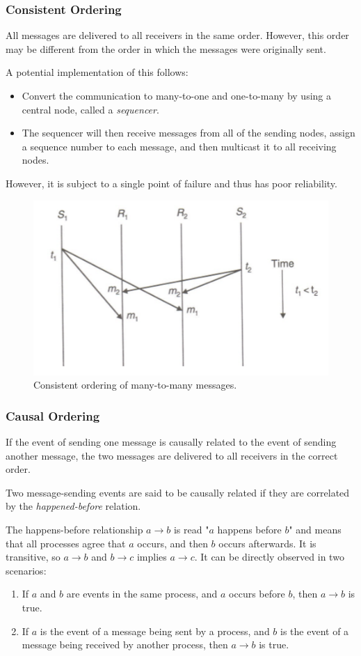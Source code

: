 \subsubsection{Consistent Ordering}
All messages are delivered to all receivers in the same order. However, this order may be different from the order in which the messages were originally sent.

A potential implementation of this follows: \begin{itemize}
\item Convert the communication to many-to-one and one-to-many by using a central node, called a \textit{sequencer}.
\item The sequencer will then receive messages from all of the sending nodes, assign a sequence number to each message, and then multicast it to all receiving nodes.
\end{itemize}

However, it is subject to a single point of failure and thus has poor reliability.

\begin{figure}[h]
\centering
\includegraphics[width=0.7\linewidth]{screenshot021}
\caption{Consistent ordering of many-to-many messages.}
\label{fig:screenshot021}
\end{figure}

\subsubsection{Causal Ordering}
\label{sssec:causalordering}
If the event of sending one message is causally related to the event of sending another message, the two messages are delivered to all receivers in the correct order.

Two message-sending events are said to be causally related if they are correlated by the \textit{happened-before} relation.

The happens-before relationship $a \rightarrow b$ is read "$a$ happens before $b$" and means that all processes agree that $a$ occurs, and then $b$ occurs afterwards. It is transitive, so $a \rightarrow b$ and $b \rightarrow c$ implies $a \rightarrow c$. It can be directly observed in two scenarios: \begin{enumerate}
\item If $a$ and $b$ are events in the same process, and $a$ occurs before $b$, then $a \rightarrow b$ is true.
\item If $a$ is the event of a message being sent by a process, and $b$ is the event of a message being received by another process, then $a \rightarrow b$ is true.
\end{enumerate}

